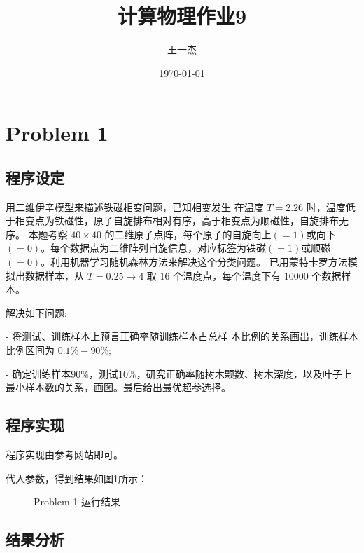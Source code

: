 \documentclass{article}
\title{计算物理作业9} %
\author[a]{王一杰} %
\affil[a]{中国科学技术大学}
\date{\today}%
\begin{document}
\maketitle
\tableofcontents

\section{Problem 1}
\subsection{程序设定}
用二维伊辛模型来描述铁磁相变问题，已知相变发生
在温度 $T=2.26$ 时，温度低于相变点为铁磁性，原子自旋排布相对有序，高于相变点为顺磁性，自旋排布无序。
本题考察 $40\times 40$ 的二维原子点阵，每个原子的自旋向上$(=1)$或向下$(=0)$。每个数据点为二维阵列自旋信息，对应标签为铁磁$(=1)$或顺磁$(=0)$。利用机器学习随机森林方法来解决这个分类问题。
已用蒙特卡罗方法模拟出数据样本，从 $T=0.25\rightarrow 4$ 取 $16$ 个温度点，每个温度下有 $10000$ 个数据样本。

解决如下问题:

- 将测试、训练样本上预言正确率随训练样本占总样
本比例的关系画出，训练样本比例区间为 $0.1\%-90\%$;

- 确定训练样本$90\%$，测试$10\%$，研究正确率随树木颗数、树木深度，以及叶子上最小样本数的关系，画图。最后给出最优超参选择。

\subsection{程序实现}

程序实现由参考网站即可。

代入参数，得到结果如图1所示：

\begin{figure}[t]
 \caption{Problem 1 运行结果}
\end{figure}

\subsection{结果分析}
\end{document}

